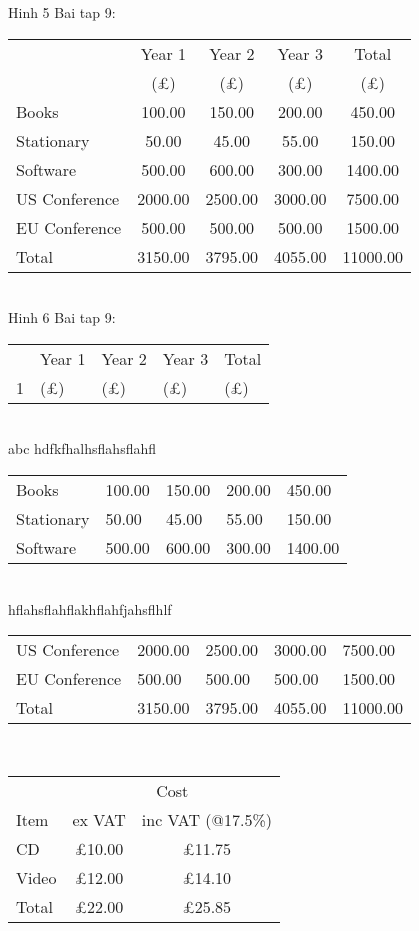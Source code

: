 \documentclass[12pt,a4paper,twoside]{article}
\begin{document}
Hinh 5 Bai tap 9:\\
\begin{tabular}{lcccc}
& Year 1 & Year 2 & Year 3 & Total\\
& (\pounds) & (\pounds) & (\pounds) & (\pounds) \\
Books & 100.00 & 150.00 & 200.00 & 450.00\\
Stationary & 50.00 &45.00 &55.00 &150.00\\
Software & 500.00& 600.00&300.00&1400.00\\
US Conference  & 2000.00& 2500.00&3000.00&7500.00\\
EU Conference  & 500.00&500.00&500.00&1500.00\\
Total & 3150.00 &3795.00 &4055.00&11000.00
\end{tabular}
\\ Hinh 6 Bai tap 9:\\
\begin{tabular}{p{3cm}|p{2cm}p{2cm}p{2cm}p{2cm}|}
\cline{2-5}
&Year 1 & Year 2 & Year 3 & Total\\1
& (\pounds) & (\pounds) & (\pounds) & (\pounds) \\ 
\cline{2-5}
\end{tabular}\\
abc hdfkfhalhsflahsflahfl\\
\begin{tabular}{|p{3cm}|p{2cm}p{2cm}p{2cm}p{2cm}|}
 \hline
Books & 100.00 & 150.00 & 200.00 & 450.00\\
Stationary & 50.00 &45.00 &55.00 &150.00\\
Software & 500.00& 600.00&300.00&1400.00\\ \hline
\end{tabular}\\
hflahsflahflakhflahfjahsflhlf\\
\begin{tabular}{|p{3cm}|p{2cm}p{2cm}p{2cm}p{2cm}|}
\hline
US Conference  & 2000.00& 2500.00&3000.00&7500.00\\
EU Conference  & 500.00&500.00&500.00&1500.00\\\hline \hline
Total & 3150.00 &3795.00 &4055.00&11000.00\\ \hline
\end{tabular}\\
\begin{tabular}{|l|cc|}\hline
 & \multicolumn{2}{c|}{Cost}\\
Item & ex VAT & inc VAT (@17.5\%)\\\hline\hline
CD & \pounds 10.00 & \pounds 11.75\\
Video & \pounds 12.00 & \pounds 14.10\\\hline
\multicolumn{1}{l|}{Total} & \pounds 22.00 &
\pounds 25.85\\\cline{2-3}
\end{tabular}\\
\end{document}
